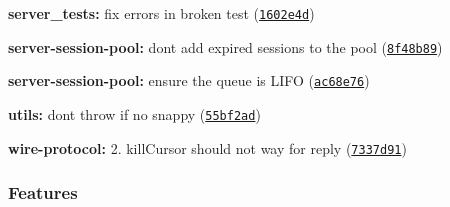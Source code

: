 \begin{DoxyItemize}
\item {\bfseries server\+\_\+tests\+:} fix errors in broken test (\href{https://github.com/christkv/mongodb-core/commit/1602e4d}{\tt 1602e4d})
\item {\bfseries server-\/session-\/pool\+:} don\textquotesingle{}t add expired sessions to the pool (\href{https://github.com/christkv/mongodb-core/commit/8f48b89}{\tt 8f48b89})
\item {\bfseries server-\/session-\/pool\+:} ensure the queue is L\+I\+FO (\href{https://github.com/christkv/mongodb-core/commit/ac68e76}{\tt ac68e76})
\item {\bfseries utils\+:} don\textquotesingle{}t throw if no snappy (\href{https://github.com/christkv/mongodb-core/commit/55bf2ad}{\tt 55bf2ad})
\item {\bfseries wire-\/protocol\+:} 2. kill\+Cursor should not way for reply (\href{https://github.com/christkv/mongodb-core/commit/7337d91}{\tt 7337d91})
\end{DoxyItemize}

\subsubsection*{Features}


